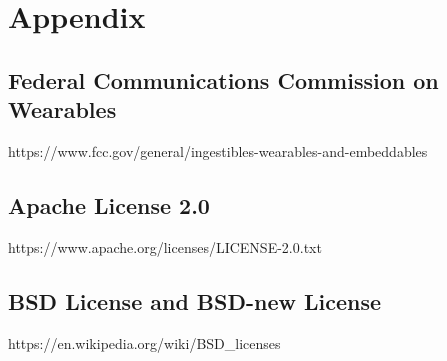\chapter{Appendix}
\section{Federal Communications Commission on Wearables}
https://www.fcc.gov/general/ingestibles-wearables-and-embeddables

\section{Apache License 2.0}
https://www.apache.org/licenses/LICENSE-2.0.txt

\section{BSD License and BSD-new License}
https://en.wikipedia.org/wiki/BSD\_licenses